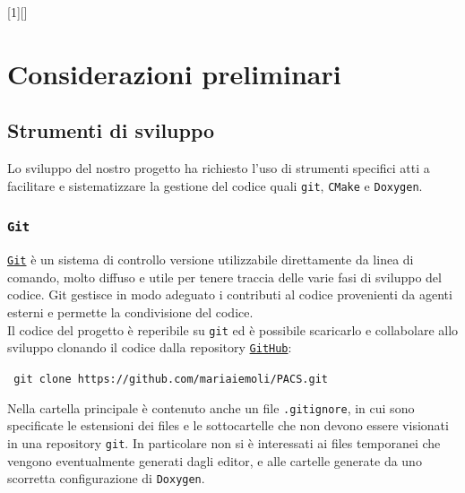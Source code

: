 [1][]{ }{}


\chapter{Considerazioni preliminari}

\section{Strumenti di sviluppo}
Lo sviluppo del nostro progetto ha richiesto l'uso di strumenti specifici atti a facilitare e sistematizzare la gestione del codice quali \texttt{git}, \texttt{CMake} e \texttt{Doxygen}.\\

\subsection{\texttt{Git}}
\href{https://github.com/}{\texttt{Git}} è un sistema di controllo versione utilizzabile direttamente da linea di comando, molto diffuso e utile per tenere traccia delle varie fasi di sviluppo del codice. Git gestisce in modo adeguato i contributi al codice provenienti da agenti esterni e permette la condivisione del codice.\\
Il codice del progetto è reperibile su \texttt{git} ed è possibile scaricarlo e collabolare allo sviluppo clonando il codice dalla repository  \href{https://github.com/}{\texttt{GitHub}}:\\
\begin{center}
\texttt{ git clone https://github.com/mariaiemoli/PACS.git}
\end{center}
Nella cartella principale è contenuto anche un file \texttt{.gitignore}, in cui sono specificate le estensioni dei files e le sottocartelle che non devono essere visionati in una repository \texttt{git}. In particolare non si è interessati ai files temporanei che vengono eventualmente generati dagli editor, e alle cartelle generate da uno scorretta configurazione di \texttt{Doxygen}.

